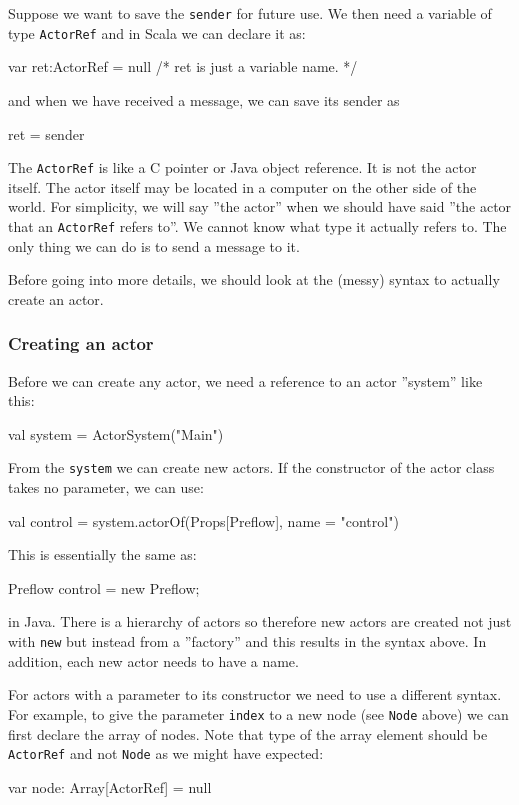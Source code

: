 \documentclass{forsete}
\begin{document}
{Suppose we want to save the \verb.sender. for future use. We then need a variable
of type \verb.ActorRef. and in Scala we can declare it as:
\begin{ccode}
var	ret:ActorRef = null	/* ret is just a variable name. */
\end{ccode}
and when we have received a message, we can save its sender as
\begin{ccode}
ret = sender
\end{ccode}

The \verb.ActorRef. is like a C pointer or Java object reference. It is not the actor itself.
The actor itself may be located in a computer on the other side of the world. For simplicity,
we will say ''the actor'' when we should have said ''the actor that an \verb.ActorRef. refers to''.
We cannot know what type it actually refers to. The only thing we can do is to send
a message to it.

Before going into more details, we should look at the (messy) syntax to actually create an actor.

\subsubsection*{Creating an actor}
Before we can create any actor, we need a reference to an actor ''system'' like this:
\begin{ccode}
	val system = ActorSystem("Main")
\end{ccode}
From the \verb.system. we can create new actors. If the constructor of the actor class
takes no parameter, we can use:
\begin{ccode}
val control = system.actorOf(Props[Preflow], name = "control")
\end{ccode}
This is essentially the same as:
\begin{ccode}
Preflow control = new Preflow;
\end{ccode}
in Java. There is a hierarchy of actors so therefore new actors are created not just with \verb.new.
but instead from a ''factory'' and this results in the syntax above. In addition, each new actor needs
to have a name.

For actors with a parameter to its constructor we need to use a different syntax.
For example, to give the parameter \verb.index. to a new node (see \verb.Node. above) we
can first declare the array of nodes. Note that type of the array element should be \verb.ActorRef.
and not \verb.Node. as we might have expected:
\begin{ccode}
var	node: Array[ActorRef] = null
\end{ccode}

}
\end{document}
